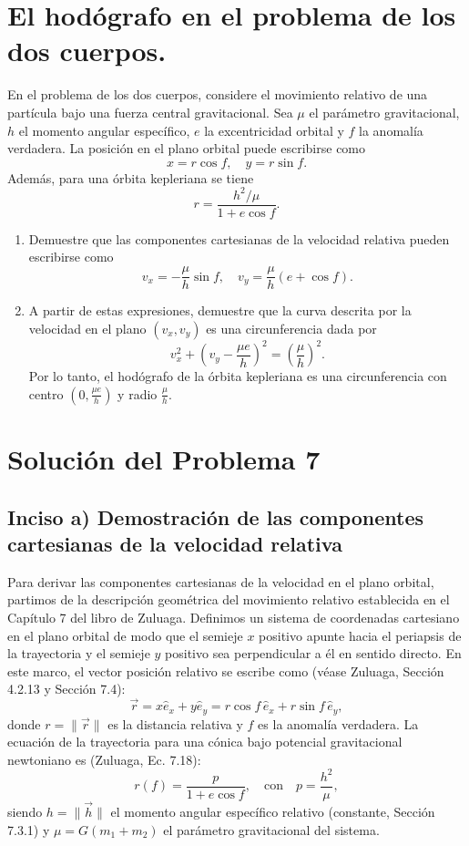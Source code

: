 \documentclass[12pt, a4paper]{article}
\begin{document}
\section{El hodógrafo en el problema de los dos cuerpos.} En el problema de los dos cuerpos, considere el movimiento relativo de una partícula bajo una fuerza central gravitacional. Sea $\mu$ el parámetro gravitacional, $h$ el momento angular específico, $e$ la excentricidad orbital y $f$ la anomalía verdadera. La posición en el plano orbital puede escribirse como
$$x = r \cos f, \quad y = r \sin f.$$
Además, para una órbita kepleriana se tiene
$$r = \frac{h^2/\mu}{1 + e \cos f}.$$
\begin{enumerate}
    \item[a)] Demuestre que las componentes cartesianas de la velocidad relativa pueden escribirse como
    $$v_x = -\frac{\mu}{h} \sin f, \quad v_y = \frac{\mu}{h} (e + \cos f).$$
    \item[b)] A partir de estas expresiones, demuestre que la curva descrita por la velocidad en el plano $(v_x, v_y)$ es una circunferencia dada por
    $$v_x^2 + \left(v_y - \frac{\mu e}{h}\right)^2 = \left(\frac{\mu}{h}\right)^2.$$
    Por lo tanto, el hodógrafo de la órbita kepleriana es una circunferencia con centro $\left(0, \frac{\mu e}{h}\right)$ y radio $\frac{\mu}{h}$.
\end{enumerate}


\section*{Solución del Problema 7}

\subsection*{Inciso a) Demostración de las componentes cartesianas de la velocidad relativa}

Para derivar las componentes cartesianas de la velocidad en el plano orbital, partimos de la descripción geométrica del movimiento relativo establecida en el Capítulo 7 del libro de Zuluaga. Definimos un sistema de coordenadas cartesiano en el plano orbital de modo que el semieje $x$ positivo apunte hacia el periapsis de la trayectoria y el semieje $y$ positivo sea perpendicular a él en sentido directo. En este marco, el vector posición relativo se escribe como (véase Zuluaga, Sección 4.2.13 y Sección 7.4):
$$
\vec{r} = x \hat{e}_x + y \hat{e}_y = r \cos f \, \hat{e}_x + r \sin f \, \hat{e}_y,
$$
donde $r = \|\vec{r}\|$ es la distancia relativa y $f$ es la anomalía verdadera. La ecuación de la trayectoria para una cónica bajo potencial gravitacional newtoniano es (Zuluaga, Ec. 7.18):
$$
r(f) = \frac{p}{1 + e \cos f}, \quad \text{con} \quad p = \frac{h^2}{\mu},
$$
siendo $h = \|\vec{h}\|$ el momento angular específico relativo (constante, Sección 7.3.1) y $\mu = G(m_1 + m_2)$ el parámetro gravitacional del sistema.
\end{document}
